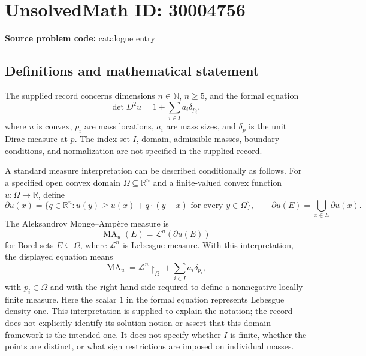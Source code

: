 \documentclass[11pt]{article}
\newcommand{\N}{\mathbb{N}}
\newcommand{\R}{\mathbb{R}}
\begin{document}
\section*{UnsolvedMath ID: 30004756}
\textbf{Source problem code:} catalogue entry
\subsection{Definitions and mathematical statement}
The supplied record concerns dimensions \(n\in\N\), \(n\geq5\), and the formal equation
\[
\det D^2u=1+\sum_{i\in I}a_i\delta_{p_i},
\]
where \(u\) is convex, \(p_i\) are mass locations, \(a_i\) are mass sizes, and \(\delta_p\) is the unit Dirac measure at \(p\). The index set \(I\), domain, admissible masses, boundary conditions, and normalization are not specified in the supplied record.

A standard measure interpretation can be described conditionally as follows. For a specified open convex domain \(\Omega\subseteq\R^n\) and a finite-valued convex function \(u:\Omega\to\R\), define
\[
\partial u(x)=\{q\in\R^n:u(y)\geq u(x)+q\cdot(y-x)\text{ for every }y\in\Omega\},
\qquad
\partial u(E)=\bigcup_{x\in E}\partial u(x).
\]
The Aleksandrov Monge--Amp\`ere measure is
\[
\operatorname{MA}_u(E)=\mathcal L^n(\partial u(E))
\]
for Borel sets \(E\subseteq\Omega\), where \(\mathcal L^n\) is Lebesgue measure. With this interpretation, the displayed equation means
\[
\operatorname{MA}_u=\mathcal L^n\!\restriction_\Omega+\sum_{i\in I}a_i\delta_{p_i},
\]
with \(p_i\in\Omega\) and with the right-hand side required to define a nonnegative locally finite measure. Here the scalar \(1\) in the formal equation represents Lebesgue density one. This interpretation is supplied to explain the notation; the record does not explicitly identify its solution notion or assert that this domain framework is the intended one. It does not specify whether \(I\) is finite, whether the points are distinct, or what sign restrictions are imposed on individual masses.
\end{document}
